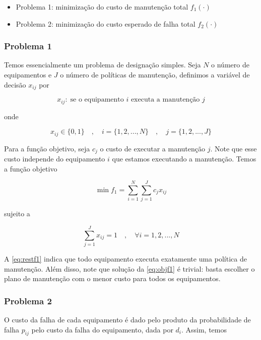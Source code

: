 \documentclass[conference]{IEEEtran}
\newcommand{\un}[1]{\;\text{#1}}
\begin{document}
\begin{itemize}
	\item Problema 1: minimização do custo de manutenção total $f_1 (\cdot)$
	\item Problema 2: minimização do custo esperado de falha total $f_2 (\cdot)$
\end{itemize}

\subsubsection{Problema 1}

Temos essencialmente um problema de designação simples. Seja $N$ o número de 
equipamentos e $J$ o número de políticas de manutenção, definimos a variável de decisão $x_{ij}$ 
por

\begin{equation}
	x_{ij}: \un{se o equipamento $i$ executa a manutenção $j$}
\end{equation}

\noindent onde 

\[ x_{ij} \in \{0,1\} \quad , \quad i = \{1, 2, ..., N\}  \quad , \quad j = \{1, 2, ..., J\} \]

Para a função objetivo, seja $c_j$ o custo de executar a manutenção $j$. Note que esse custo 
independe do equipamento $i$ que estamos executando a manutenção. Temos a função objetivo  

\begin{equation}\label{eq:objf1}
	\min f_1 = \sum_{i=1}^{N} \sum_{j=1}^{J} c_j x_{ij}
\end{equation}

\noindent sujeito a 

\begin{equation}\label{eq:restf1}
	\sum_{j=1}^{J} x_{ij} = 1 \quad , \quad \forall i = {1, 2, ..., N}
\end{equation}

A \ref{eq:restf1} indica que todo equipamento executa exatamente uma política de manutenção.
Além disso, note que solução da \ref{eq:objf1} é trivial: basta escolher o plano de 
manutenção com o menor custo para todos os equipamentos.

\subsubsection{Problema 2}

O custo da falha de cada equipamento é dado pelo produto da probabilidade de falha $p_{ij}$ pelo custo da falha do equipamento,
dada por $d_i$. Assim, temos 
\end{document}

